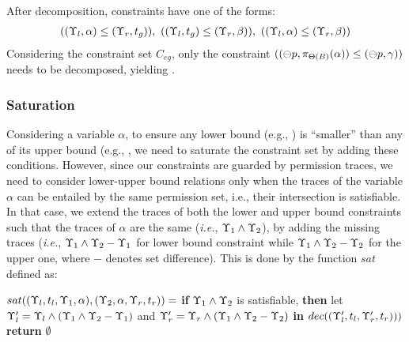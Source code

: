 {{{After decomposition, constraints have one of the forms:
{\myeqsize\begin{align*}
((\Upsilon_l,\alpha)\leq(\Upsilon_r,t_g)), ~((\Upsilon_l,t_g)\leq(\Upsilon_r,\beta)), ~((\Upsilon_l,\alpha)\leq(\Upsilon_r,\beta))
\end{align*}}
Considering the constraint set $C_{eg}$, only the constraint
$
((\ominus p,\pi_{{\Theta(B)}}({\alpha}))\leq(\ominus p,\gamma))
$
needs to be decomposed, yielding .


\subsubsection{\textbf{Saturation}}
Considering a variable $\alpha$, to ensure any lower bound (e.g., ) is ``smaller'' than any of its upper bound (e.g., , we need to saturate the constraint set by adding these conditions.
However, since our constraints are guarded by permission traces, we need to consider lower-upper bound relations only when the traces of the variable $\alpha$ can be entailed by the same permission set, i.e., their intersection is satisfiable. \iffalse (i.e., $\issatisfied{\trace_1 \land \trace_2} $)\fi In that case, we extend the traces of both the lower and upper bound constraints such that the traces of $\alpha$ are the same (\emph{i.e.}, $\Upsilon_1 \land \Upsilon_2$), by adding the missing traces (\emph{i.e.}, $\Upsilon_1 \land \Upsilon_2 - \Upsilon_1$ for lower bound constraint while $\Upsilon_1 \land \Upsilon_2 - \Upsilon_2$ for the upper one, where $-$ denotes set difference).
This is done by the function $sat$ defined as:

{\myeqsize\begin{algorithmic}
\STATE $sat(({\Upsilon_l},{t_l},{\Upsilon_1},{\alpha}),({\Upsilon_2},{\alpha},{\Upsilon_r},{t_r}))=$
\STATE \quad \textbf{if} $\Upsilon_1 \land \Upsilon_2$ is satisfiable,
\textbf{then} let $\Upsilon'_l = \Upsilon_l\land (\Upsilon_1 \land \Upsilon_2-\Upsilon_1)$ and $\Upsilon'_r=\Upsilon_r\land (\Upsilon_1 \land \Upsilon_2-\Upsilon_2)$ \textbf{in} $dec(({\Upsilon'_l },{t_l},{ \Upsilon'_r},{t_r})))$
\STATE  \quad \textbf{return} $\emptyset$
\end{algorithmic}}



}}}
